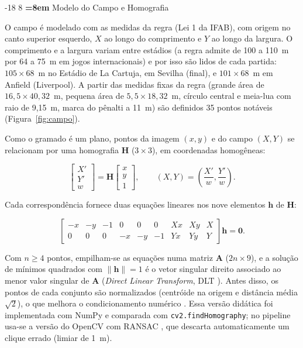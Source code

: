 \documentclass[12pt]{article}
\makeatletter
\renewcommand\subsection{\@startsection{subsection}{2}{\z@}%
                       {-18\p@ \@plus -4\p@ \@minus -4\p@}%
                       {8\p@ \@plus 4\p@ \@minus 4\p@}%
                       {\normalfont\normalsize\bfseries\boldmath
                        \rightskip=\z@ \@plus 8em\pretolerance=10000 }}
\makeatother
\begin{document}
\subsection{Modelo do Campo e Homografia}

O campo é modelado com as medidas da regra (Lei 1 da IFAB), com origem no canto
superior esquerdo, $X$ ao longo do comprimento e $Y$ ao longo da largura. O
comprimento e a largura variam entre estádios (a regra admite de 100 a 110~m por 64
a 75~m em jogos internacionais) e por isso são lidos de cada partida: $105\times68$~m
no Estádio de La Cartuja, em Sevilha (final), e $101\times68$~m em Anfield
(Liverpool). A partir das medidas fixas da regra (grande área de $16{,}5\times40{,}32$~m,
pequena área de $5{,}5\times18{,}32$~m, círculo central e meia-lua com raio de
9,15~m, marca do pênalti a 11~m) são definidos 35 pontos notáveis
(Figura~\ref{fig:campo}).

Como o gramado é um plano, pontos da imagem $(x, y)$ e do campo $(X, Y)$ se
relacionam por uma homografia $\mathbf{H}$ ($3\times3$), em coordenadas homogêneas:

\begin{equation}
\begin{bmatrix} X' \\ Y' \\ w \end{bmatrix} = \mathbf{H}
\begin{bmatrix} x \\ y \\ 1 \end{bmatrix}, \qquad
(X, Y) = \left(\frac{X'}{w}, \frac{Y'}{w}\right).
\end{equation}

Cada correspondência fornece duas equações lineares nos nove elementos
$\mathbf{h}$ de $\mathbf{H}$:

\begin{equation}
\begin{bmatrix}
-x & -y & -1 & 0 & 0 & 0 & Xx & Xy & X \\
0 & 0 & 0 & -x & -y & -1 & Yx & Yy & Y
\end{bmatrix} \mathbf{h} = \mathbf{0}.
\end{equation}

Com $n \ge 4$ pontos, empilham-se as equações numa matriz $\mathbf{A}$
($2n\times9$), e a solução de mínimos quadrados com $\lVert\mathbf{h}\rVert = 1$ é o
vetor singular direito associado ao menor valor singular de $\mathbf{A}$
(\textit{Direct Linear Transform}, DLT \cite{hartley2004}). Antes disso, os pontos
de cada conjunto são normalizados (centróide na origem e distância média
$\sqrt{2}$), o que melhora o condicionamento numérico \cite{hartley1997}. Essa
versão didática foi implementada com NumPy e comparada com
\texttt{cv2.findHomography}; no pipeline usa-se a versão do OpenCV com RANSAC
\cite{fischler1981}, que descarta automaticamente um clique errado (limiar de 1~m).
\end{document}
